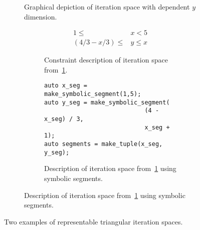 \begin{figure}
\begin{subfigure}{0.4\columnwidth}
\caption{Graphical depiction of iteration space with dependent $y$ dimension.}\label{triangularIterationSpace2}
\end{subfigure}
\hspace{0.05\columnwidth}
\begin{subfigure}{0.55\columnwidth}
\begin{subfigure}{\columnwidth}
\begin{align}
	1 \leq &x < 5 \\
	(4/3 - x/3) \leq &y \leq x
\end{align}
\caption{Constraint description of iteration space from~\ref{triangularIterationSpace2}.}\label{constraintDescription2}
\end{subfigure}

\vspace{20pt}

\begin{subfigure}{\columnwidth}
\begin{lstlisting}[]
auto x_seg = make_symbolic_segment(1,5);
auto y_seg = make_symbolic_segment(
							(4 - x_seg) / 3, 
							x_seg + 1);
auto segments = make_tuple(x_seg, y_seg);
\end{lstlisting}
\caption{Description of iteration space from~\ref{triangularIterationSpace2} using symbolic segments.}\label{symseg2}
\end{subfigure}
\end{subfigure}
\caption{Two examples of representable triangular iteration spaces.}\label{goodTriangles}
\end{figure}



